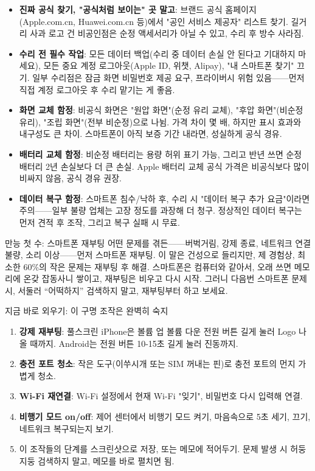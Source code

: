 \begin{itemize}
  \item \textbf{진짜 공식 찾기, "공식처럼 보이는" 곳 말고}: 브랜드 공식 홈페이지(Apple.com.cn, Huawei.com.cn 등)에서 "공인 서비스 제공자" 리스트 찾기. 길거리 사과 로고 건 비공인점은 순정 액세서리가 아닐 수 있고, 수리 후 방수 사라짐.
  \item \textbf{수리 전 필수 작업}: 모든 데이터 백업(수리 중 데이터 손실 안 된다고 기대하지 마세요), 모든 중요 계정 로그아웃(Apple ID, 위챗, Alipay), "내 스마트폰 찾기" 끄기. 일부 수리점은 잠금 화면 비밀번호 제공 요구, 프라이버시 위험 있음——먼저 직접 계정 로그아웃 후 수리 맡기는 게 좋음.
  \item \textbf{화면 교체 함정}: 비공식 화면은 "원압 화면"(순정 유리 교체), "후압 화면"(비순정 유리), "조립 화면"(전부 비순정)으로 나뉨. 가격 차이 몇 배, 하지만 표시 효과와 내구성도 큰 차이. 스마트폰이 아직 보증 기간 내라면, 성실하게 공식 경유.
  \item \textbf{배터리 교체 함정}: 비순정 배터리는 용량 허위 표기 가능, 그리고 반년 쓰면 순정 배터리 2년 손실보다 더 큰 손실. Apple 배터리 교체 공식 가격은 비공식보다 많이 비싸지 않음, 공식 경유 권장.
  \item \textbf{데이터 복구 함정}: 스마트폰 침수/낙하 후, 수리 시 "데이터 복구 추가 요금"이라면 주의——일부 불량 업체는 고장 정도를 과장해 더 청구. 정상적인 데이터 복구는 먼저 견적 후 조작, 그리고 복구 실패 시 무료.
\end{itemize}

\begin{tcbwarn}{만능 첫 수: 스마트폰 재부팅}
어떤 문제를 겪든——버벅거림, 강제 종료, 네트워크 연결 불량, 소리 이상——먼저 스마트폰 재부팅. 이 말은 건성으로 들리지만, 제 경험상, 최소한 60\%의 작은 문제는 재부팅 후 해결. 스마트폰은 컴퓨터와 같아서, 오래 쓰면 메모리에 온갖 잡동사니 쌓이고, 재부팅은 비우고 다시 시작. 그러니 다음번 스마트폰 문제 시, 서둘러 “어떡하지” 검색하지 말고, 재부팅부터 하고 보세요.

\end{tcbwarn}

\begin{tcbpractice}{지금 바로 외우기: 이 구명 조작은 완벽히 숙지}
\begin{enumerate}
  \item \textbf{강제 재부팅}: 풀스크린 iPhone은 볼륨 업 볼륨 다운 전원 버튼 길게 눌러 Logo 나올 때까지. Android는 전원 버튼 10-15초 길게 눌러 진동까지.
  \item \textbf{충전 포트 청소}: 작은 도구(이쑤시개 또는 SIM 꺼내는 핀)로 충전 포트의 먼지 가볍게 청소.
  \item \textbf{Wi-Fi 재연결}: Wi-Fi 설정에서 현재 Wi-Fi "잊기", 비밀번호 다시 입력해 연결.
  \item \textbf{비행기 모드 on/off}: 제어 센터에서 비행기 모드 켜기, 마음속으로 5초 세기, 끄기, 네트워크 복구되는지 보기.
  \item 이 조작들의 단계를 스크린샷으로 저장, 또는 메모에 적어두기. 문제 발생 시 허둥지둥 검색하지 말고, 메모를 바로 펼치면 됨.
\end{enumerate}

\end{tcbpractice}
